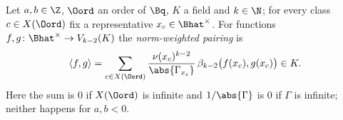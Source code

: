 Let $a,b\in\Z$, $\Oord$ an order of $\Bq$, $K$ a field and $k\in\N$; for every class $c\in X(\Oord)$ fix a representative
$x_c\in\Bhat^\times$. For functions $f,g\colon\Bhat^\times\to V_{k-2}(K)$ the \emph{norm-weighted pairing} is
\[
  \langle f,g\rangle=\sum_{c\in X(\Oord)}\frac{\nu(x_c)^{k-2}}{\abs{\Gamma_{x_c}}}\,\beta_{k-2}\bigl(f(x_c),g(x_c)\bigr)\in K.
\]
Here the sum is $0$ if $X(\Oord)$ is infinite and $1/\abs{\Gamma}$ is $0$ if $\Gamma$ is infinite; neither happens for $a,b<0$.

